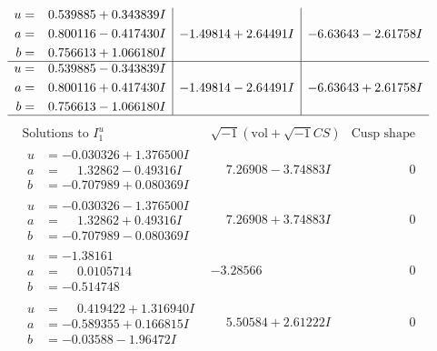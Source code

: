 \documentclass[1p]{elsarticle_modified}
\theoremstyle{definition}
\newcommand{\I}{\sqrt{-1}}
\begin{document}
$$\begin{array}{c|c|c}
\begin{aligned}
u &= \phantom{-}0.539885 + 0.343839 I \\
a &= \phantom{-}0.800116 - 0.417430 I \\
b &= \phantom{-}0.756613 + 1.066180 I\end{aligned}
 & -1.49814 + 2.64491 I & -6.63643 - 2.61758 I \\ \hline\begin{aligned}
u &= \phantom{-}0.539885 - 0.343839 I \\
a &= \phantom{-}0.800116 + 0.417430 I \\
b &= \phantom{-}0.756613 - 1.066180 I\end{aligned}
 & -1.49814 - 2.64491 I & -6.63643 + 2.61758 I\\
 \hline 
 \end{array}$$\newpage$$\begin{array}{c|c|c}  
\text{Solutions to }I^u_{1}& \I (\text{vol} + \sqrt{-1}CS) & \text{Cusp shape}\\
 \hline 
\begin{aligned}
u &= -0.030326 + 1.376500 I \\
a &= \phantom{-}1.32862 - 0.49316 I \\
b &= -0.707989 + 0.080369 I\end{aligned}
 & \phantom{-}7.26908 - 3.74883 I & \phantom{-0.000000 } 0 \\ \hline\begin{aligned}
u &= -0.030326 - 1.376500 I \\
a &= \phantom{-}1.32862 + 0.49316 I \\
b &= -0.707989 - 0.080369 I\end{aligned}
 & \phantom{-}7.26908 + 3.74883 I & \phantom{-0.000000 } 0 \\ \hline\begin{aligned}
u &= -1.38161\phantom{ +0.000000I} \\
a &= \phantom{-}0.0105714\phantom{ +0.000000I} \\
b &= -0.514748\phantom{ +0.000000I}\end{aligned}
 & -3.28566\phantom{ +0.000000I} & \phantom{-0.000000 } 0 \\ \hline\begin{aligned}
u &= \phantom{-}0.419422 + 1.316940 I \\
a &= -0.589355 + 0.166815 I \\
b &= -0.03588 - 1.96472 I\end{aligned}
 & \phantom{-}5.50584 + 2.61222 I & \phantom{-0.000000 } 0 \\ \hline\begin{aligned}

\end{aligned}
\end{array}$$
\end{document}
